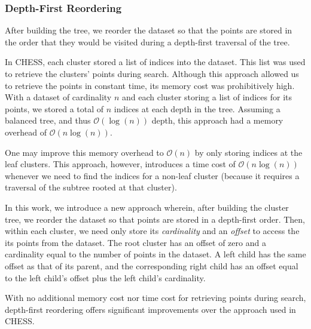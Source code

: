 \subsubsection{Depth-First Reordering}
\label{sec:methods:clustering:depth-first-reordering}

After building the tree, we reorder the dataset so that the points are stored in the order that they would be visited during a depth-first traversal of the tree.

In CHESS, each cluster stored a list of indices into the dataset.
This list was used to retrieve the clusters' points during search.
Although this approach allowed us to retrieve the points in constant time, its memory cost was prohibitively high.
With a dataset of cardinality $n$ and each cluster storing a list of indices for its points, we stored a total of $n$ indices at each depth in the tree.
Assuming a balanced tree, and thus $\mathcal{O}(\log(n))$ depth, this approach had a memory overhead of $\mathcal{O}(n\log(n))$.

One may improve this memory overhead to $\mathcal{O}(n)$ by only storing indices at the leaf clusters.
This approach, however, introduces a time cost of $\mathcal{O}(n\log(n))$ whenever we need to find the indices for a non-leaf cluster (because it requires a traversal of the subtree rooted at that cluster).

In this work, we introduce a new approach wherein, after building the cluster tree, we reorder the dataset so that points are stored in a depth-first order.
Then, within each cluster, we need only store its \emph{cardinality} and an \emph{offset} to access the its points from the dataset.
The root cluster has an offset of zero and a cardinality equal to the number of points in the dataset.
A left child has the same offset as that of its parent, and the corresponding right child has an offset equal to the left child's offset plus the left child's cardinality.

With no additional memory cost nor time cost for retrieving points during search, depth-first reordering offers significant improvements over the approach used in CHESS.



